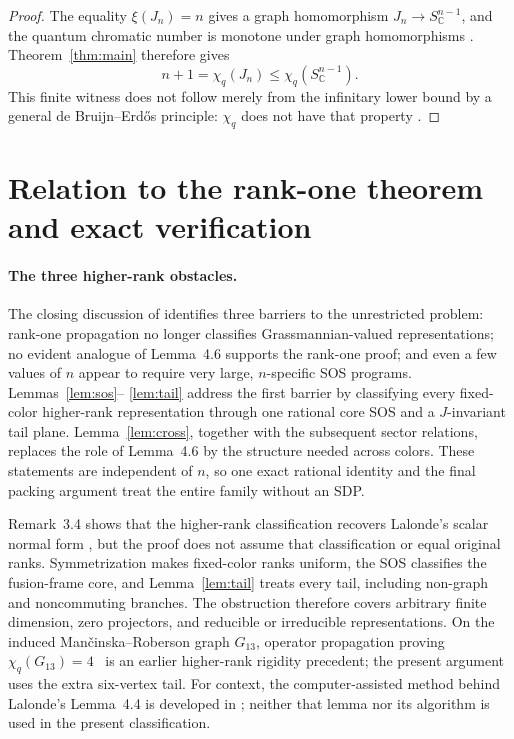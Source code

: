 \documentclass[11pt]{article}
\newcommand{\C}{\mathbb C}
\begin{document}
\begin{proof}
The equality $\xi(J_n)=n$ gives a graph homomorphism
$J_n\to S_{\C}^{n-1}$, and the quantum chromatic number is monotone under
graph homomorphisms \cite[Sections~1.1 and 2.3.3]{Lalonde2026}.
Theorem~\ref{thm:main} therefore gives
\[
       n+1=\chi_q(J_n)\leq\chi_q(S_{\C}^{n-1}).
\]
This finite witness does not follow merely from the infinitary lower bound by
a general de Bruijn--Erd\H{o}s principle: $\chi_q$ does not have that property
\cite[Proposition~3.3]{Lalonde2026}.
\end{proof}

\section{Relation to the rank-one theorem and exact verification}

\paragraph{The three higher-rank obstacles.}
The closing discussion of \cite[Section~4.2]{Lalonde2026} identifies three
barriers to the unrestricted problem: rank-one propagation no longer
classifies Grassmannian-valued representations; no evident analogue of
Lemma~4.6 supports the rank-one proof; and even a few values of $n$ appear to
require very large, $n$-specific SOS programs.  Lemmas~\ref{lem:sos}--
\ref{lem:tail} address the first barrier by classifying every fixed-color
higher-rank representation through one rational core SOS and a $J$-invariant
tail plane.  Lemma~\ref{lem:cross}, together with the subsequent sector
relations, replaces the role of Lemma~4.6 by the structure needed across
colors.  These statements are independent of $n$, so one exact rational
identity and the final packing argument treat the entire family without an
SDP.

Remark~3.4 shows that the higher-rank classification recovers Lalonde's
scalar normal form \cite[Theorem~4.5]{Lalonde2026}, but the proof does not
assume that classification or equal original ranks.  Symmetrization makes
fixed-color ranks uniform, the SOS classifies the fusion-frame core, and
Lemma~\ref{lem:tail} treats every tail, including non-graph and noncommuting
branches.  The obstruction therefore covers arbitrary finite dimension, zero
projectors, and reducible or irreducible representations.  On the induced
Man\v{c}inska--Roberson graph $G_{13}$, operator propagation proving
$\chi_q(G_{13})=4$~\cite{MancinskaRoberson2016} is an earlier higher-rank
rigidity precedent; the present argument uses the extra six-vertex tail.
For context, the computer-assisted method behind Lalonde's Lemma~4.4 is
developed in \cite{LalondeSmallGraphs2025}; neither that lemma nor its
algorithm is used in the present classification.
\end{document}
